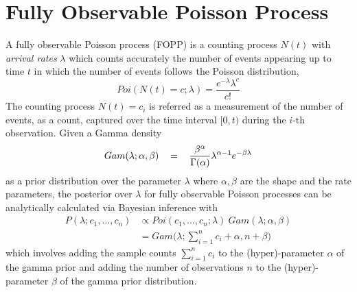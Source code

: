 \section{Fully Observable Poisson Process}
\label{sec:preliminaries}

A fully observable Poisson process (FOPP) is a counting process $N(t)$ with \textit{arrival rates} $\lambda$ which counts accurately the number of events appearing up to time $t$ in which the number of events follows the Poisson distribution,
\begin{equation}
    \label{eq:pmf_poisson}
	Poi(N(t) = c ; \lambda) = \frac{e ^{-\lambda} \lambda ^{c}}{c!}
\end{equation}
The counting process $N(t) = c_i$ is referred as a measurement of the number of events, as a count, captured over the time interval $[0, t)$ during the $i$-th observation.
Given a Gamma density 
\begin{equation}
    \label{eq:pdf_gamma}
    \begin{tabular}{rcl}
        $Gam(\lambda ; \alpha, \beta)$ & = & $\displaystyle\frac{\beta ^{\alpha}}{\Gamma (\alpha)} \lambda ^{\alpha - 1} e^{-\beta \lambda}$ \\ [1ex]
    \end{tabular}
\end{equation}
as a prior distribution over the parameter $\lambda$ where $\alpha, \beta$ are the shape and the rate parameters, the posterior over $\lambda$ for fully observable Poisson processes can be analytically calculated via Bayesian inference with
\begin{equation}
    \label{eq:posterior_fopp}
    \begin{array}{lll}
        P(\lambda ; c_1, \ldots, c_n) & \varpropto Poi(c_1, \ldots, c_n ; \lambda) ~ Gam(\lambda ; \alpha, \beta) \\
         & = Gam \Bigg(\lambda ; \displaystyle\sum_{i=1}^{n} c_i + \alpha, n + \beta \Bigg)
    \end{array}
\end{equation}
which involves adding the sample counts $\sum_{i=1}^{n} c_i$ to the (hyper)-parameter $\alpha$ of the gamma prior and adding the number of observations $n$ to the (hyper)-parameter $\beta$ of the gamma prior distribution.

